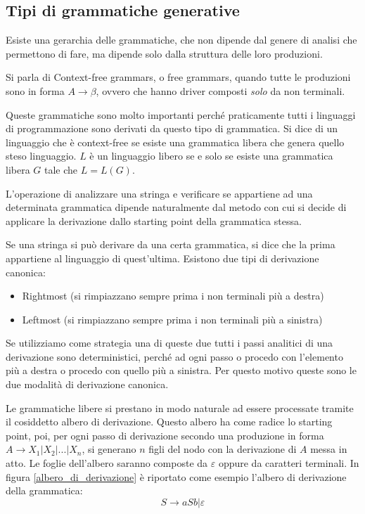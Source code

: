 \documentclass[class=book, crop=false, oneside, 12pt]{standalone}
\begin{document}
\subsection{Tipi di grammatiche generative}
Esiste una gerarchia delle grammatiche, che non dipende dal genere di analisi che permettono di fare, ma dipende solo dalla struttura delle loro produzioni.

Si parla di Context-free grammars, o free grammars, quando tutte le produzioni sono in forma $A \to \beta$, ovvero che hanno driver composti \emph{solo} da non terminali.

Queste grammatiche sono molto importanti perché praticamente tutti i linguaggi di programmazione sono derivati da questo tipo di grammatica.
Si dice di un linguaggio che è context-free se esiste una grammatica libera che genera quello steso linguaggio.
$L$ è un linguaggio libero se e solo se esiste una grammatica libera $G$ tale che $L=L(G)$.

L’operazione di analizzare una stringa e verificare se appartiene ad una determinata grammatica dipende naturalmente dal metodo con cui si decide di applicare la derivazione dallo starting point della grammatica stessa.

Se una stringa si può derivare da una certa grammatica, si dice che la prima appartiene al linguaggio di quest'ultima.
Esistono due tipi di derivazione canonica:
\begin{itemize}
    \item Rightmost (si rimpiazzano sempre prima i non terminali più a destra)
    \item Leftmost (si rimpiazzano sempre prima i non terminali più a sinistra)
\end{itemize}
Se utilizziamo come strategia una di queste due tutti i passi analitici di una derivazione sono deterministici, perché ad ogni passo o procedo con l’elemento più a destra o procedo con quello più a sinistra. Per questo motivo queste sono le due modalità di derivazione canonica.

Le grammatiche libere si prestano in modo naturale ad essere processate tramite il cosiddetto albero di derivazione.
Questo albero ha come radice lo starting point, poi, per ogni passo di derivazione secondo una produzione in forma $A \to X_1 | X_2 |...| X_n $, si generano $n$ figli del nodo con la derivazione di $A$ messa in atto.
Le foglie dell’albero saranno composte da $\varepsilon$ oppure da caratteri terminali. In figura \ref{albero_di_derivazione} è riportato come esempio l'albero di derivazione della grammatica:
\begin{equation}
    S \to aSb | \varepsilon
    \label{grammatica_allbero}
\end{equation}
\end{document}

